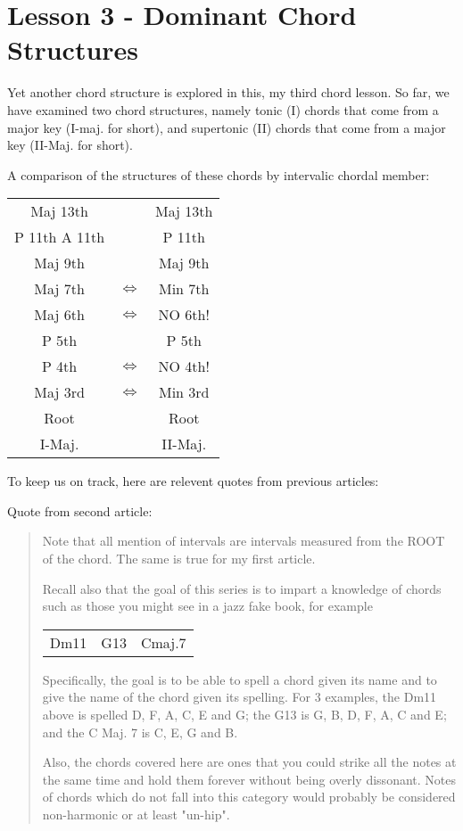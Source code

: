 \section{Lesson 3 - Dominant Chord Structures}

Yet another chord structure is explored in this, my third chord lesson.
So far, we have examined two chord structures, namely tonic (I) chords
that come from a major key (I-maj. for short), and supertonic (II) 
chords that come from a major key (II-Maj. for short).

A comparison of the structures of these chords by intervalic chordal member:
\begin{center}
\begin{tabular}{ | c c c | }
	\hline
	Maj 13th					&					& Maj 13th				\\
	P 11th   A 11th   & 				& P 11th					\\
	Maj 9th           & 				& Maj 9th					\\
	Maj 7th    				& $\iff$	& Min 7th					\\
	Maj 6th						& $\iff$	& NO 6th!					\\
	P 5th             & 				& P 5th						\\
	P 4th							& $\iff$	& NO 4th!					\\
	Maj 3rd						& $\iff$	& Min 3rd					\\
	Root              & 				& Root						\\
	\hline
  I-Maj.            & 				& II-Maj.					\\
  \hline
\end{tabular}
\end{center}

To keep us on track, here are relevent quotes from previous articles:

Quote from second article:
\begin{quote}
Note that all mention of intervals are intervals measured from the ROOT
of the chord. The same is true for my first article.

Recall also that the goal of this series is to impart a knowledge of
chords such as those you might see in a jazz fake book, for example

\begin{center}
\begin{tabular}{ c c c }
  Dm11 & G13 & Cmaj.7\\
\end{tabular}
\end{center}

Specifically, the goal is to be able to spell a chord given its name and
to give the name of the chord given its spelling. For 3 examples, the
Dm11 above is spelled D, F, A, C, E and G; the G13 is G, B, D, F, A, C
and E; and the C Maj. 7 is C, E, G and B.

Also, the chords covered here are ones that you could strike all the
notes at the same time and hold them forever without being overly
dissonant. Notes of chords which do not fall into this category would
probably be considered non-harmonic or at least "un-hip".
\end{quote}

